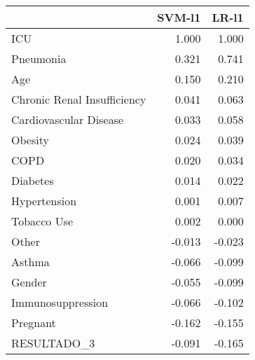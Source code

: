 \begin{tabular}{lrr}
\toprule
{} &  SVM-l1 &  LR-l1 \\
\midrule
ICU                         &   1.000 &  1.000 \\
Pneumonia                   &   0.321 &  0.741 \\
Age                         &   0.150 &  0.210 \\
Chronic Renal Insufficiency &   0.041 &  0.063 \\
Cardiovascular Disease      &   0.033 &  0.058 \\
Obesity                     &   0.024 &  0.039 \\
COPD                        &   0.020 &  0.034 \\
Diabetes                    &   0.014 &  0.022 \\
Hypertension                &   0.001 &  0.007 \\
Tobacco Use                 &   0.002 &  0.000 \\
Other                       &  -0.013 & -0.023 \\
Asthma                      &  -0.066 & -0.099 \\
Gender                      &  -0.055 & -0.099 \\
Immunosuppression           &  -0.066 & -0.102 \\
Pregnant                    &  -0.162 & -0.155 \\
RESULTADO\_3                 &  -0.091 & -0.165 \\
\bottomrule
\end{tabular}

